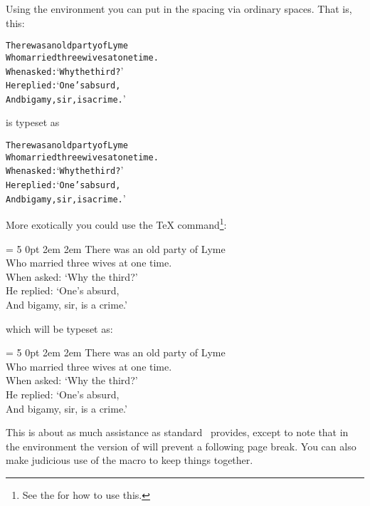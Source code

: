 Using the  environment you can put in the spacing via ordinary
spaces. That is, this:
\begin{lcode}
\begin{alltt}\normalfont
There was an old party of Lyme
Who married three wives at one time.
      When asked: `Why the third?' 
      He replied: `One's absurd, 
And bigamy, sir, is a crime.'
\end{alltt}
\end{lcode}
is typeset as

\begin{alltt}
\normalfont
There was an old party of Lyme
Who married three wives at one time.
      When asked: `Why the third?' 
      He replied: `One's absurd, 
And bigamy, sir, is a crime.'
\end{alltt}

More exotically you could use the TeX \cmd{\parshape} 
command\footnote{See the  for how to use this.}:
\begin{lcode}
\parshape = 5 0pt \linewidth 0pt \linewidth 
              2em \linewidth 2em \linewidth 0pt \linewidth
\noindent There was an old party of Lyme \\
Who married three wives at one time. \\
When asked: `Why the third?' \\
He replied: `One's absurd, \\
And bigamy, sir, is a crime.' \par
\end{lcode}
which will be typeset as:

\vspace*{\onelineskip}

\parshape = 5 0pt \linewidth 0pt \linewidth 
              2em \linewidth 2em \linewidth 0pt \linewidth
\noindent There was an old party of Lyme \\
Who married three wives at one time. \\
When asked: `Why the third?' \\
He replied: `One's absurd, \\
And bigamy, sir, is a crime.' \par


\vspace*{\onelineskip}

   This is about as much assistance as standard \alltx\ provides, except
to note that in the  environment the \cmd{\\*} version of \cmd{\\}
will prevent a following page break. 
You can also make judicious use
of the \cmd{\needspace} macro to keep things together.

